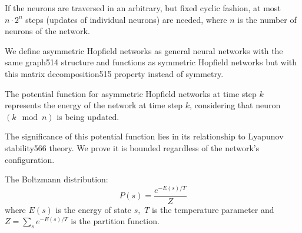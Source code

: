 \begin{theorem}\label{HopfieldNet_convergence_fairCor}
\leanok  
If the neurons are 
traversed in an arbitrary, but fixed cyclic fashion, at most $n\cdot2^n$ steps
 (updates of individual neurons) are needed, where $n$ is the number of neurons of the network.
\end{theorem}

\begin{definition}\label{Asymmetric HopfieldNetwork}
\leanok  
We define asymmetric Hopfield networks as general neural networks with the same graph514
structure and functions as symmetric Hopfield networks but with this matrix decomposition515
property instead of symmetry.
\end{definition}

\begin{definition}\label{PotentialFunction}
The potential function for asymmetric Hopfield networks at time step $k$
represents the energy of the network at time step $k$, considering that neuron $(k \mod n)$ is being updated.
\leanok
\end{definition}

\begin{lemma}\label{Potential function is bounded}
\leanok
The significance of this potential function lies in its relationship to Lyapunov stability566
theory. We prove it is bounded regardless of the network’s configuration.
\end{lemma}

\begin{definition}\label{boltzmannDistribution}
\leanok
The Boltzmann distribution:
$$P(s) = \frac{e^{-E(s)/T}}{Z}$$
where $E(s)$ is the energy of state $s,$ $T$ is the temperature parameter and 
$Z = \sum_{s} e^{-E(s)/T}$ is the partition function.
\end{definition}

